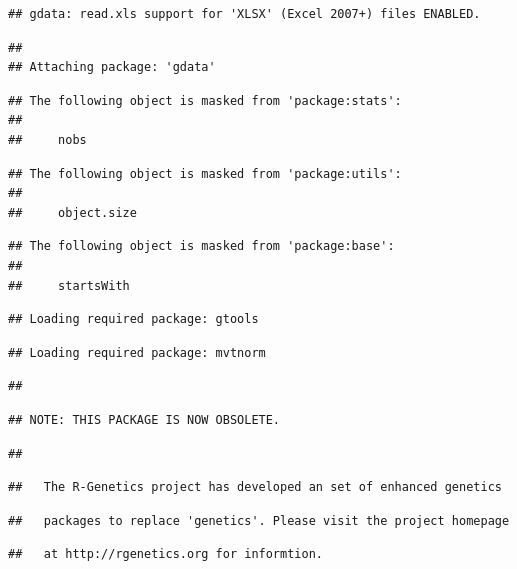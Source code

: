 \documentclass[
]{article}
\begin{document}
\begin{verbatim}
## gdata: read.xls support for 'XLSX' (Excel 2007+) files ENABLED.
\end{verbatim}

\begin{verbatim}
## 
## Attaching package: 'gdata'
\end{verbatim}

\begin{verbatim}
## The following object is masked from 'package:stats':
## 
##     nobs
\end{verbatim}

\begin{verbatim}
## The following object is masked from 'package:utils':
## 
##     object.size
\end{verbatim}

\begin{verbatim}
## The following object is masked from 'package:base':
## 
##     startsWith
\end{verbatim}

\begin{verbatim}
## Loading required package: gtools
\end{verbatim}

\begin{verbatim}
## Loading required package: mvtnorm
\end{verbatim}

\begin{verbatim}
## 
\end{verbatim}

\begin{verbatim}
## NOTE: THIS PACKAGE IS NOW OBSOLETE.
\end{verbatim}

\begin{verbatim}
## 
\end{verbatim}

\begin{verbatim}
##   The R-Genetics project has developed an set of enhanced genetics
\end{verbatim}

\begin{verbatim}
##   packages to replace 'genetics'. Please visit the project homepage
\end{verbatim}

\begin{verbatim}
##   at http://rgenetics.org for informtion.
\end{verbatim}
\end{document}
